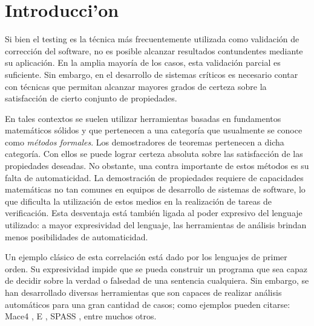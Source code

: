 \chapter{Introducci'on}


Si bien el testing es la técnica más frecuentemente utilizada como validación de corrección del software, no es posible alcanzar resultados contundentes mediante su aplicación. 
En la amplia mayoría de los casos, esta validación parcial es suficiente. 
Sin embargo, en el desarrollo de sistemas críticos es necesario contar con técnicas que permitan alcanzar mayores grados de certeza sobre la satisfacción de cierto conjunto de propiedades.

En tales contextos se suelen utilizar herramientas basadas en fundamentos matemáticos sólidos y que pertenecen a una categoría que usualmente se conoce como \emph{métodos formales}. 
Los demostradores de teoremas pertenecen a dicha categoría. 
Con ellos se puede lograr certeza absoluta sobre las satisfacción de las propiedades deseadas. 
No obstante, una contra importante de estos métodos es su falta de automaticidad. 
La demostración de propiedades requiere de capacidades matemáticas no tan comunes en equipos de desarrollo de sistemas de software, lo que dificulta la utilización de estos medios en la realización de tareas de verificación. 
Esta desventaja está también ligada al poder expresivo del lenguaje utilizado: a mayor expresividad del lenguaje, las herramientas de análisis brindan menos posibilidades de automaticidad.

Un ejemplo clásico de esta correlación está dado por los lenguajes de primer orden. 
Su expresividad impide que se pueda construir un programa que sea capaz de decidir sobre la verdad o falsedad de una sentencia cualquiera. 
Sin embargo, se han desarrollado diversas herramientas que son capaces de realizar análisis automáticos para una gran cantidad de casos; como ejemplos pueden citarse: Mace4 \cite{m05}, E \cite{s13}, SPASS \cite{WDFKSW09}, entre muchos otros. 

